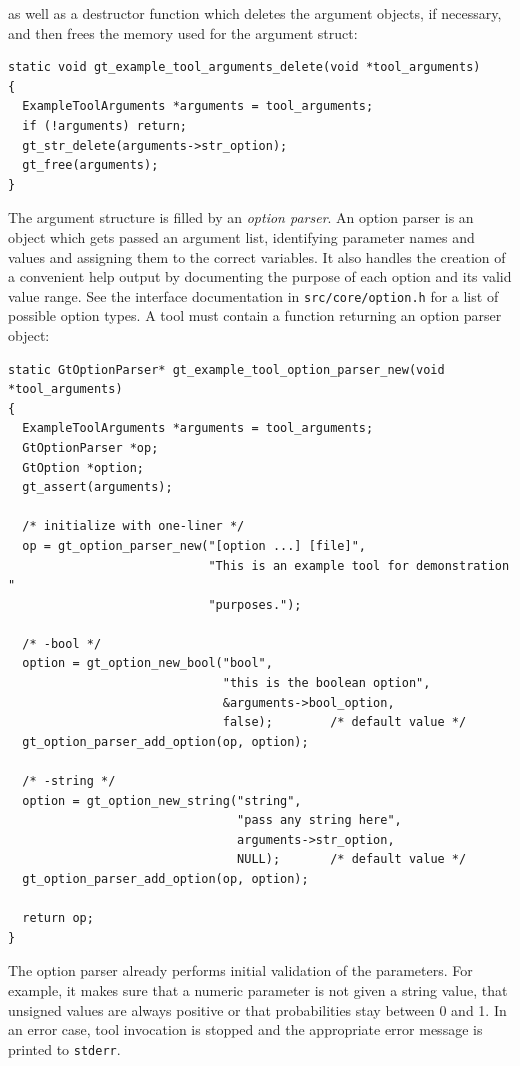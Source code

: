 \documentclass[11pt,final]{article}
\newcommand{\keyword}[1]{\lstinline{#1}}
\begin{document}
as well as a destructor function which deletes the argument objects, if
necessary, and then frees the memory used for the argument struct:

\begin{lstlisting}
static void gt_example_tool_arguments_delete(void *tool_arguments)
{
  ExampleToolArguments *arguments = tool_arguments;
  if (!arguments) return;
  gt_str_delete(arguments->str_option);
  gt_free(arguments);
}
\end{lstlisting}

The argument structure is filled by an \emph{option parser}. An option parser
is an object which gets passed an argument list, identifying parameter names
and values and assigning them to the correct variables. It also handles
the creation of a convenient help output by documenting the purpose of each
option and its valid value range. See the interface documentation in
\keyword{src/core/option.h} for a list of possible option types.
A tool must contain a function returning an option parser object:

\begin{lstlisting}
static GtOptionParser* gt_example_tool_option_parser_new(void *tool_arguments)
{
  ExampleToolArguments *arguments = tool_arguments;
  GtOptionParser *op;
  GtOption *option;
  gt_assert(arguments);

  /* initialize with one-liner */
  op = gt_option_parser_new("[option ...] [file]",
                            "This is an example tool for demonstration "
                            "purposes.");

  /* -bool */
  option = gt_option_new_bool("bool",
                              "this is the boolean option",
                              &arguments->bool_option,
                              false);        /* default value */
  gt_option_parser_add_option(op, option);

  /* -string */
  option = gt_option_new_string("string",
                                "pass any string here",
                                arguments->str_option,
                                NULL);       /* default value */
  gt_option_parser_add_option(op, option);

  return op;
}
\end{lstlisting}

The option parser already performs initial validation of the parameters. For
example, it makes sure that a numeric parameter is not given a string value,
that unsigned values are always positive or that probabilities stay between 0
and 1.
In an error case, tool invocation is stopped and the appropriate error message
is printed to \keyword{stderr}.
\end{document}

